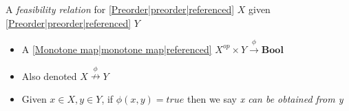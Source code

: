 
A \emph{feasibility relation} for \ref{Preorder|preorder|referenced} $X$ given \ref{Preorder|preorder|referenced} $Y$

\begin{itemize}
    \item  A \ref{Monotone map|monotone map|referenced} $X^{op}\times Y \xrightarrow{\phi} \mathbf{Bool}$
    \item Also denoted $X \overset{\phi}\nrightarrow Y$
    \item Given $x \in X, y \in Y$, if $\phi(x,y)=true$ then we say \emph{x can be obtained from y}
  \end{itemize}
